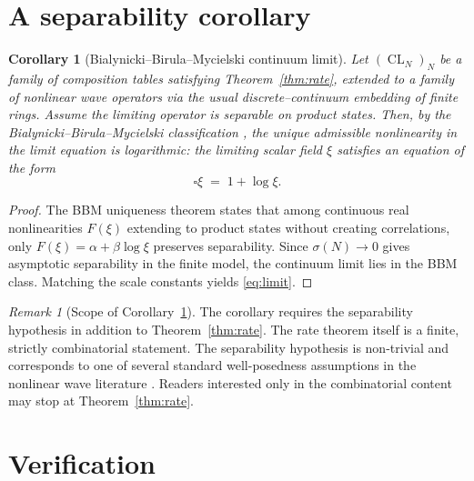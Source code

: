 \documentclass[11pt,reqno]{amsart}
\theoremstyle{plain}
\newtheorem{corollary}[theorem]{Corollary}
\theoremstyle{definition}
\theoremstyle{remark}
\newtheorem*{remark}{Remark}
\DeclareMathOperator{\CL}{CL}
\begin{document}
\section{A separability corollary}\label{sec:bb}

\begin{corollary}[Bialynicki--Birula--Mycielski continuum limit]\label{cor:bb}
Let $(\CL_N)_{N}$ be a family of composition tables satisfying
Theorem~\ref{thm:rate}, extended to a family of nonlinear wave
operators via the usual discrete--continuum embedding of finite
rings. Assume the limiting operator is separable on product states.
Then, by the Bialynicki--Birula--Mycielski classification
\cite{BB1976}, the unique admissible nonlinearity in the limit
equation is logarithmic: the limiting scalar field $\xi$
satisfies an equation of the form
\begin{equation}\label{eq:limit}
  \square\xi\;=\;1+\log\xi.
\end{equation}
\end{corollary}

\begin{proof}
The BBM uniqueness theorem \cite{BB1976} states that among
continuous real nonlinearities $F(\xi)$ extending to product states
without creating correlations, only $F(\xi)=\alpha+\beta\log\xi$
preserves separability. Since $\sigma(N)\to 0$ gives asymptotic
separability in the finite model, the continuum limit lies in the
BBM class. Matching the scale constants \cite{BB1976,HoeghKrohn1971}
yields \eqref{eq:limit}.
\end{proof}

\begin{remark}[Scope of Corollary~\ref{cor:bb}]
The corollary requires the separability hypothesis in addition to
Theorem~\ref{thm:rate}. The rate theorem itself is a finite,
strictly combinatorial statement. The separability hypothesis
is non-trivial and corresponds to one of several standard
well-posedness assumptions in the nonlinear wave literature
\cite{CazenaveHaraux1980,HoeghKrohn1971}. Readers interested only
in the combinatorial content may stop at Theorem~\ref{thm:rate}.
\end{remark}

\section{Verification}\label{sec:verify}
\end{document}
